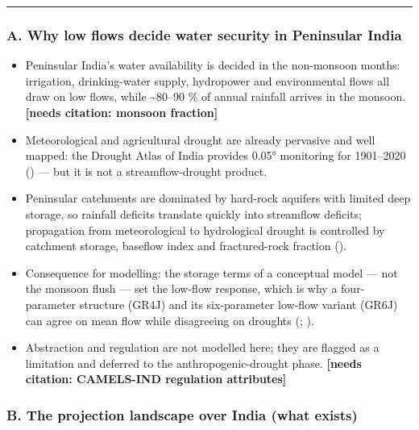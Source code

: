 \documentclass[
  english,
  11pt,
]{article}
\providecommand{\tightlist}{%
  \setlength{\itemsep}{0pt}\setlength{\parskip}{0pt}}
\begin{document}
\begin{center}\rule{0.5\linewidth}{0.5pt}\end{center}

\subsubsection{A. Why low flows decide water security in Peninsular
India}\label{a.-why-low-flows-decide-water-security-in-peninsular-india}

\begin{itemize}
\tightlist
\item
  Peninsular India's water availability is decided in the non-monsoon
  months: irrigation, drinking-water supply, hydropower and
  environmental flows all draw on low flows, while \textasciitilde80--90
  \% of annual rainfall arrives in the monsoon. \textbf{{[}needs
  citation: monsoon fraction{]}}
\item
  Meteorological and agricultural drought are already pervasive and well
  mapped: the Drought Atlas of India provides 0.05° monitoring for
  1901--2020 () --- but it is not a streamflow-drought product.
\item
  Peninsular catchments are dominated by hard-rock aquifers with limited
  deep storage, so rainfall deficits translate quickly into streamflow
  deficits; propagation from meteorological to hydrological drought is
  controlled by catchment storage, baseflow index and fractured-rock
  fraction ().
\item
  Consequence for modelling: the storage terms of a conceptual model ---
  not the monsoon flush --- set the low-flow response, which is why a
  four-parameter structure (GR4J) and its six-parameter low-flow variant
  (GR6J) can agree on mean flow while disagreeing on droughts
  (;
  ).
\item
  Abstraction and regulation are not modelled here; they are flagged as
  a limitation and deferred to the anthropogenic-drought phase.
  \textbf{{[}needs citation: CAMELS-IND regulation attributes{]}}
\end{itemize}

\subsubsection{B. The projection landscape over India (what
exists)}\label{b.-the-projection-landscape-over-india-what-exists}
\end{document}
